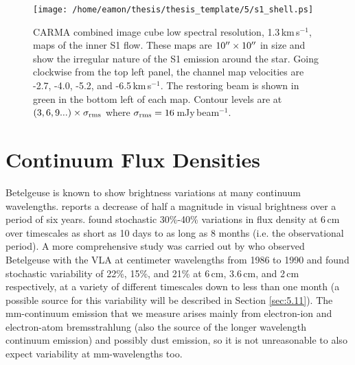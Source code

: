 \begin{figure}[!ht]
\centering 
\texttt{[image: /home/eamon/thesis/thesis\_template/5/s1\_shell.ps]}
\caption[CARMA maps of the inner S1 flow]{CARMA combined image cube low spectral resolution, 1.3\,km\,s$^{-1}$, maps of the inner S1 flow. These maps are $10^{\prime\prime} \times 10^{\prime\prime}$ in size and show the irregular nature of the S1 emission around the star. Going clockwise from the top left panel, the channel map velocities are -2.7, -4.0, -5.2, and -6.5\,km\,s$^{-1}$. The restoring beam is shown in green in the bottom left of each map. Contour levels are at $(3,6,9...)\times \sigma _{\rm{rms}}$ where $\sigma _{\rm{rms}} = 16$\,mJy\,beam$^{-1}$.}
\label{fig:5.12a}
\end{figure}

\section{Continuum Flux Densities}\label{sec:5.9}
Betelgeuse is known to show brightness variations at many continuum wavelengths. \cite{goldberg_1984} reports a decrease of half a magnitude in visual brightness over a period of six years. \cite{bookbinder_1987} found stochastic 30\%-40\% variations in flux density at 6\,cm over timescales as short as 10 days to as long as 8 months (i.e. the observational period). A more comprehensive study was carried out by \cite{drake_1992} who observed Betelgeuse with the VLA at centimeter wavelengths from 1986 to 1990 and found stochastic variability of 22\%, 15\%, and 21\% at 6\,cm, 3.6\,cm, and 2\,cm respectively, at a variety of different timescales down to less than one month (a possible source for this variability will be described in Section \ref{sec:5.11}). The mm-continuum emission that we measure arises mainly from electron-ion and electron-atom bremsstrahlung (also the source of the longer wavelength continuum emission) and possibly dust emission, so it is not unreasonable to also expect variability at mm-wavelengths too. 

